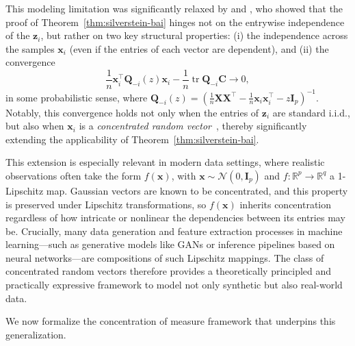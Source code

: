 \documentclass[12pt]{article}
\DeclareMathOperator{\tr}{tr}
\begin{document}
This modeling limitation was significantly relaxed by \citet{elkaroui2009} and \citet{pajor2009}, who showed that the proof of Theorem~\ref{thm:silverstein-bai} hinges not on the entrywise independence of the $ \mathbf{z}_i $, but rather on two key structural properties: (i) the independence across the samples $ \mathbf{x}_i $ (even if the entries of each vector are dependent), and (ii) the convergence
$$
\frac{1}{n} \mathbf{x}_i^\top \mathbf{Q}_{-i}(z) \mathbf{x}_i - \frac{1}{n} \tr\mathbf{Q}_{-i} \mathbf{C} \to 0,
$$
in some probabilistic sense, where $ \mathbf{Q}_{-i}(z) = \left( \frac{1}{n} \mathbf{X}\mathbf{X}^\top - \frac{1}{n} \mathbf{x}_i \mathbf{x}_i^\top - z \mathbf{I}_p \right)^{-1} $. Notably, this convergence holds not only when the entries of $\mathbf{z}_i$ are standard i.i.d., but also when $ \mathbf{x}_i $ is a \emph{concentrated random vector}~\citep{elkaroui2009}, thereby significantly extending the applicability of Theorem~\ref{thm:silverstein-bai}.

This extension is especially relevant in modern data settings, where realistic observations often take the form $ f(\mathbf{x}) $, with $ \mathbf{x} \sim \mathcal{N}(0, \mathbf{I}_p) $ and $ f : \mathbb{R}^p \to \mathbb{R}^q $ a 1-Lipschitz map. Gaussian vectors are known to be concentrated, and this property is preserved under Lipschitz transformations, so $ f(\mathbf{x}) $ inherits concentration regardless of how intricate or nonlinear the dependencies between its entries may be. Crucially, many data generation and feature extraction processes in machine learning—such as generative models like GANs or inference pipelines based on neural networks—are compositions of such Lipschitz mappings. The class of concentrated random vectors therefore provides a theoretically principled and practically expressive framework to model not only synthetic but also real-world data.

We now formalize the concentration of measure framework that underpins this generalization.
\end{document}
